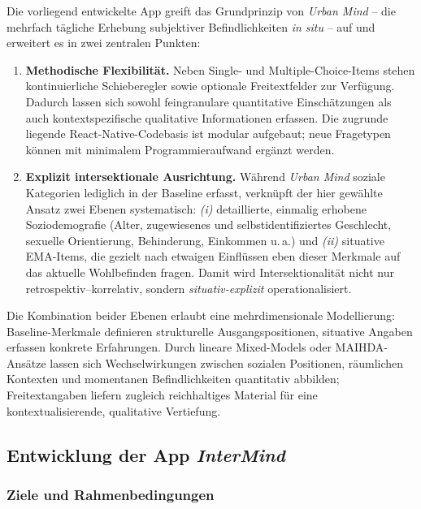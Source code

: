 Die vorliegend entwickelte App greift das Grundprinzip von \emph{Urban Mind} – die mehrfach tägliche Erhebung subjektiver Befindlichkeiten \emph{in situ} – auf und erweitert es in zwei zentralen Punkten:

\begin{enumerate}
    \item \textbf{Methodische Flexibilität.} Neben Single- und Multiple-Choice-Items stehen kontinuierliche Schieberegler sowie optionale Freitextfelder zur Verfügung. Dadurch lassen sich sowohl feingranulare quantitative Einschätzungen als auch kontextspezifische qualitative Informationen erfassen. Die zugrunde liegende React-Native-Codebasis ist modular aufgebaut; neue Fragetypen können mit minimalem Programmieraufwand ergänzt werden.

    \item \textbf{Explizit intersektionale Ausrichtung.} Während \emph{Urban Mind} soziale Kategorien lediglich in der Baseline erfasst, verknüpft der hier gewählte Ansatz zwei Ebenen systematisch: \textit{(i)} detaillierte, einmalig erhobene Soziodemografie (Alter, zugewiesenes und selbstidentifiziertes Geschlecht, sexuelle Orientierung, Behinderung, Einkommen u.\,a.) und \textit{(ii)} situative EMA-Items, die gezielt nach etwaigen Einflüssen eben dieser Merkmale auf das aktuelle Wohlbefinden fragen. Damit wird Intersektionalität nicht nur retrospektiv–korrelativ, sondern \emph{situativ-explizit} operationalisiert.
\end{enumerate}

Die Kombination beider Ebenen erlaubt eine mehrdimensionale Modellierung: Baseline-Merkmale definieren strukturelle Ausgangspositionen, situative Angaben erfassen konkrete Erfahrungen. Durch lineare Mixed-Models oder MAIHDA-Ansätze lassen sich Wechselwirkungen zwischen sozialen Positionen, räumlichen Kontexten und momentanen Befindlichkeiten quantitativ abbilden; Freitextangaben liefern zugleich reichhaltiges Material für eine kontextualisierende, qualitative Vertiefung.

\subsection{Entwicklung der App \textit{InterMind}}

\subsubsection{Ziele und Rahmenbedingungen}

